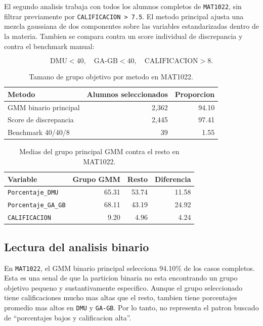 \documentclass[11pt,letterpaper]{article}
\newcommand{\code}[1]{\texttt{#1}}
\begin{document}
El segundo analisis trabaja con todos los alumnos completos de \code{MAT1022}, sin filtrar previamente por \code{CALIFICACION > 7.5}. El metodo principal ajusta una mezcla gaussiana de dos componentes sobre las variables estandarizadas dentro de la materia. Tambien se compara contra un score individual de discrepancia y contra el benchmark manual:

\[
\text{DMU} < 40,\quad \text{GA-GB} < 40,\quad \text{CALIFICACION} > 8.
\]

\begin{table}[H]
\centering
\caption{Tamano de grupo objetivo por metodo en MAT1022.}
\begin{tabular}{lrr}
\toprule
Metodo & Alumnos seleccionados & Proporcion \\
\midrule
GMM binario principal & 2,362 & 94.10 \\
Score de discrepancia & 2,445 & 97.41 \\
Benchmark 40/40/8 & 39 & 1.55 \\
\bottomrule
\end{tabular}
\end{table}

\begin{table}[H]
\centering
\caption{Medias del grupo principal GMM contra el resto en MAT1022.}
\begin{tabular}{lrrr}
\toprule
Variable & Grupo GMM & Resto & Diferencia \\
\midrule
\code{Porcentaje\_DMU} & 65.31 & 53.74 & 11.58 \\
\code{Porcentaje\_GA\_GB} & 68.11 & 43.19 & 24.92 \\
\code{CALIFICACION} & 9.20 & 4.96 & 4.24 \\
\bottomrule
\end{tabular}
\end{table}

\subsection{Lectura del analisis binario}

En \code{MAT1022}, el GMM binario principal selecciona 94.10\% de los casos completos. Esta es una senal de que la particion binaria no esta encontrando un grupo objetivo pequeno y sustantivamente especifico. Aunque el grupo seleccionado tiene calificaciones mucho mas altas que el resto, tambien tiene porcentajes promedio mas altos en \code{DMU} y \code{GA-GB}. Por lo tanto, no representa el patron buscado de ``porcentajes bajos y calificacion alta''.
\end{document}
